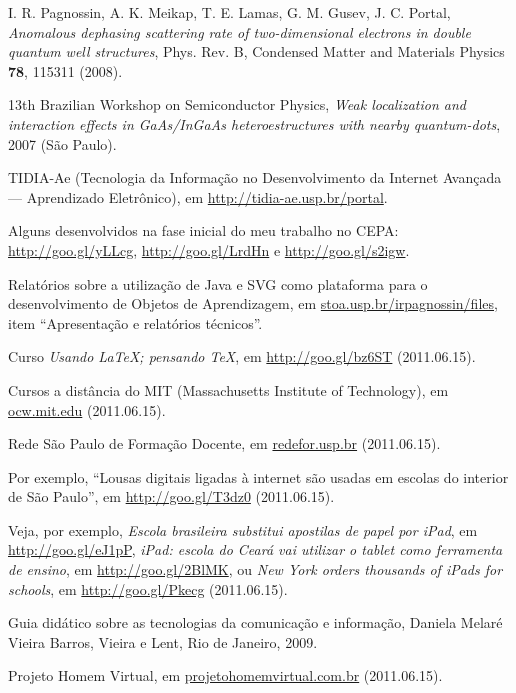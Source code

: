 \begin{thebibliography}{+++}
	 I. R. Pagnossin, A. K. Meikap, T. E. Lamas, G. M. Gusev, J. C. Portal, \textsl{Anomalous dephasing scattering rate of two-dimensional electrons in double quantum well structures}, Phys. Rev. B, Condensed Matter and Materials Physics \textbf{78}, 115311 (2008). 
	
	 13th Brazilian Workshop on Semiconductor Physics, \textsl{Weak localization and interaction effects in GaAs/InGaAs heteroestructures with nearby quantum-dots}, 2007 (São Paulo).
	
	 TIDIA-Ae (Tecnologia da Informação no Desenvolvimento da Internet Avançada --- Aprendizado Eletrônico), em \url{http://tidia-ae.usp.br/portal}.
	
	 Alguns  desenvolvidos na fase inicial do meu trabalho no CEPA: \url{http://goo.gl/yLLcg}, \url{http://goo.gl/LrdHn} e \url{http://goo.gl/s2igw}.
	
	 Relatórios sobre a utilização de Java e SVG como plataforma para o desenvolvimento de Objetos de Aprendizagem, em \url{stoa.usp.br/irpagnossin/files}, item ``Apresentação e relatórios técnicos''.
	
	 Curso \textsl{Usando \LaTeX; pensando \TeX}, em \url{http://goo.gl/bz6ST} (2011.06.15).
	
	 Cursos a distância do MIT (Massachusetts Institute of Technology), em \url{ocw.mit.edu} (2011.06.15).
	
	 Rede São Paulo de Formação Docente, em \url{redefor.usp.br} (2011.06.15).
	
	 Por exemplo, ``Lousas digitais ligadas à internet são usadas em escolas do interior de São Paulo'', em \url{http://goo.gl/T3dz0} (2011.06.15).
	
	 Veja, por exemplo, \textsl{Escola brasileira substitui apostilas de papel por iPad}, em \url{http://goo.gl/eJ1pP}, \textsl{iPad: escola do Ceará vai utilizar o tablet como ferramenta de ensino}, em \url{http://goo.gl/2BlMK}, ou \textsl{New York orders thousands of iPads for schools}, em \url{http://goo.gl/Pkecg} (2011.06.15).
	
	 Guia didático sobre as tecnologias da comunicação e informação, Daniela Melaré Vieira Barros, Vieira e Lent, Rio de Janeiro, 2009.
	
	 Projeto Homem Virtual, em \url{projetohomemvirtual.com.br} (2011.06.15).
	

\end{thebibliography}
